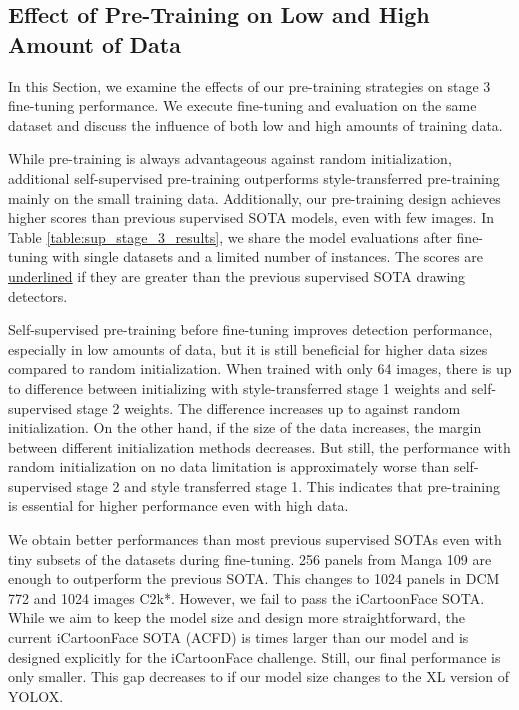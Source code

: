\documentclass{article}
\begin{document}
\subsection{Effect of Pre-Training on Low and High Amount of Data}

In this Section, we examine the effects of our pre-training strategies on stage 3 fine-tuning performance. We execute fine-tuning and evaluation on the same dataset and discuss the influence of both low and high amounts of training data.

While pre-training is always advantageous against random initialization, additional self-supervised pre-training outperforms style-transferred pre-training mainly on the small training data. Additionally, our pre-training design achieves higher scores than previous supervised SOTA models, even with few images. In Table \ref{table:sup_stage_3_results}, we share the model evaluations after fine-tuning with single datasets and a limited number of instances. The scores are \underline{underlined} if they are greater than the previous supervised SOTA drawing detectors.

Self-supervised pre-training before fine-tuning improves detection performance, especially in low amounts of data, but it is still beneficial for higher data sizes compared to random initialization. When trained with only 64 images, there is up to  difference between initializing with style-transferred stage 1 weights and self-supervised stage 2 weights. The difference increases up to  against random initialization. On the other hand, if the size of the data increases, the margin between different initialization methods decreases. But still, the performance with random initialization on no data limitation is approximately  worse than self-supervised stage 2 and style transferred stage 1. This indicates that pre-training is essential for higher performance even with high data.

We obtain better performances than most previous supervised SOTAs even with tiny subsets of the datasets during fine-tuning. 256 panels from Manga 109 are enough to outperform the previous SOTA. This changes to 1024 panels in DCM 772 and 1024 images C2k*. However, we fail to pass the iCartoonFace SOTA. While we aim to keep the model size and design more straightforward, the current iCartoonFace SOTA (ACFD) is  times larger than our model and is designed explicitly for the iCartoonFace challenge. Still, our final performance is only  smaller. This gap decreases to  if our model size changes to the XL version of YOLOX.
\end{document}
